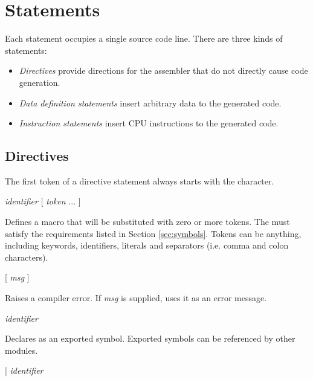 \documentclass[a4paper,12pt,twoside,extrafontsizes]{memoir}
\begin{document}
\section{Statements}

Each statement occupies a single source code line. There are three kinds of statements:

\begin{itemize}
	\item \emph{Directives} provide directions for the assembler that do not directly cause code generation.
	\item \emph{Data definition statements} insert arbitrary data to the generated code.
	\item \emph{Instruction statements} insert \lxp{} CPU instructions to the generated code.
\end{itemize}

\subsection{Directives}

The first token of a directive statement always starts with the \code{\#} character.

\begin{codepar}
 \emph{identifier} [ \emph{token} ... ]
\end{codepar}

Defines a macro that will be substituted with zero or more tokens. The  must satisfy the requirements listed in Section \ref{sec:symbols}. Tokens can be anything, including keywords, identifiers, literals and separators (i.e. comma and colon characters).

\begin{codepar}
 [ \emph{msg} ]
\end{codepar}

Raises a compiler error. If \emph{msg} is supplied, uses it as an error message.

\begin{codepar}
 \emph{identifier}
\end{codepar}

Declares  as an exported symbol. Exported symbols can be referenced by other modules.

\begin{codepar}
 |  \emph{identifier}
\end{codepar}
\end{document}
